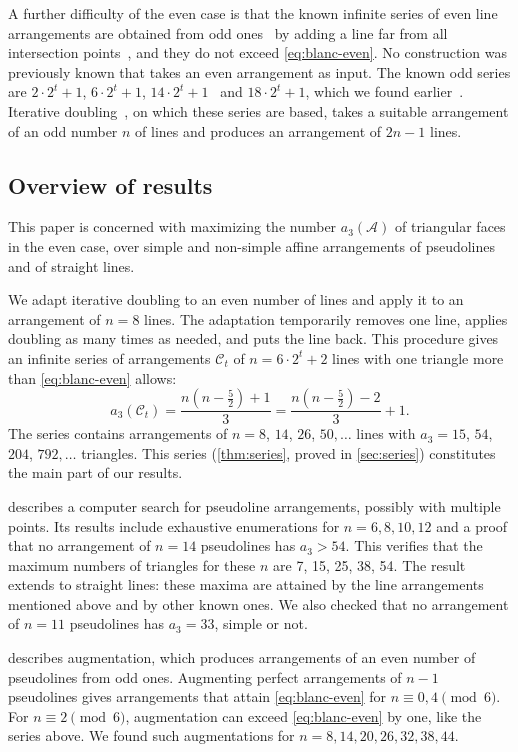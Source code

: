 A further difficulty of the even case is that the known infinite series of even line arrangements are obtained from odd ones~\cite{for,bbl} by adding a line far from all intersection points~\cite{bbl,blanc11,savchuk25}, and they do not exceed \eqref{eq:blanc-even}. No construction was previously known that takes an even arrangement as input. The known odd series are $2\cdot2^t+1$, $6\cdot2^t+1$, $14\cdot2^t+1$~\cite{bbl} and $18\cdot2^t+1$, which we found earlier~\cite{pu26}. Iterative doubling~\cite{bbl}, on which these series are based, takes a suitable arrangement of an odd number $n$ of lines and produces an arrangement of $2n-1$ lines.

\subsection{Overview of results}

This paper is concerned with maximizing the number $a_{3}(\mathcal{A})$ of triangular faces in the even case, over simple and non-simple affine arrangements of pseudolines and of straight lines.

We adapt iterative doubling to an even number of lines and apply it to an arrangement of $n=8$ lines. The adaptation temporarily removes one line, applies doubling as many times as needed, and puts the line back. This procedure gives an infinite series of arrangements $\mathcal{C}_t$ of $n=6\cdot2^t+2$ lines with one triangle more than \eqref{eq:blanc-even} allows:
\[
a_3(\mathcal{C}_t)=\frac{n\left(n-\frac52\right)+1}{3}
=\frac{n\left(n-\frac52\right)-2}{3}+1.
\]
The series contains arrangements of $n=8$, $14$, $26$, $50,\ldots$ lines with $a_3=15$, $54$, $204$, $792,\ldots$ triangles. This series (\cref{thm:series}, proved in \cref{sec:series}) constitutes the main part of our results.

 describes a computer search for pseudoline arrangements, possibly with multiple points. Its results include exhaustive enumerations for $n=6, 8, 10, 12$ and a proof that no arrangement of $n=14$ pseudolines has $a_3>54$. This verifies that the maximum numbers of triangles for these $n$ are 7, 15, 25, 38, 54. The result extends to straight lines: these maxima are attained by the line arrangements mentioned above and by other known ones. We also checked that no arrangement of $n=11$ pseudolines has $a_3=33$, simple or not.

 describes augmentation, which produces arrangements of an even number of pseudolines from odd ones.
Augmenting perfect arrangements of $n-1$ pseudolines gives arrangements that attain \eqref{eq:blanc-even} for $n\equiv0,4\pmod 6$.
For $n\equiv2\pmod 6$, augmentation can exceed \eqref{eq:blanc-even} by one, like the series above. We found such augmentations for $n=8,14,20,26,32,38,44$.

